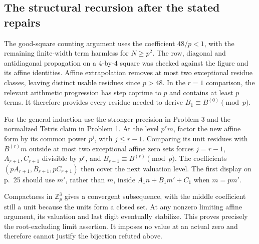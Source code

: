 \documentclass[10pt]{article}
\begin{document}
\subsection*{The structural recursion after the stated repairs}
The good-square counting argument uses the coefficient \(48/p<1\), with the remaining finite-width term harmless for \(N\ge p^2\). The row, diagonal and antidiagonal propagation on a \(4\)-by-\(4\) square was checked against the figure and its affine identities. Affine extrapolation removes at most two exceptional residue classes, leaving distinct usable residues since \(p>48\). In the \(r=1\) comparison, the relevant arithmetic progression has step coprime to \(p\) and contains at least \(p\) terms. It therefore provides every residue needed to derive \(B_1\equiv B^{(0)}\pmod p\).\par
For the general induction use the stronger precision in Problem 3 and the normalized Tetris claim in Problem 1. At the level \(p^r m\), factor the new affine form by its common power \(p^j\), with \(j\le r-1\). Comparing its unit residues with \(B^{(r)}m\) outside at most two exceptional affine zero sets forces \(j=r-1\), \(A_{r+1},C_{r+1}\) divisible by \(p^r\), and \(B_{r+1}\equiv B^{(r)}\pmod p\). The coefficients \((pA_{r+1},B_{r+1},pC_{r+1})\) then cover the next valuation level. The first display on p. 25 should use \(m'\), rather than \(m\), inside \(A_1n+B_1m'+C_1\) when \(m=pm'\).\par
Compactness in \(\mathbb Z_p^3\) gives a convergent subsequence, with the middle coefficient still a unit because the units form a closed set. At any nonzero limiting affine argument, its valuation and last digit eventually stabilize. This proves precisely the root-excluding limit assertion. It imposes no value at an actual zero and therefore cannot justify the bijection refuted above.\par
\end{document}
